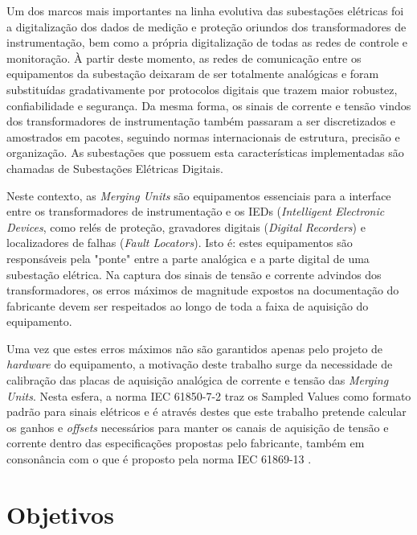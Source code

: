 Um dos marcos mais importantes na linha evolutiva das subestações elétricas foi a digitalização dos dados de medição e proteção oriundos dos transformadores de instrumentação, bem como a própria digitalização de todas as redes de controle e monitoração. À partir deste momento, as redes de comunicação entre os equipamentos da subestação deixaram de ser totalmente analógicas e foram substituídas gradativamente por protocolos digitais que trazem maior robustez, confiabilidade e segurança. Da mesma forma, os sinais de corrente e tensão vindos dos transformadores de instrumentação também passaram a ser discretizados e amostrados em pacotes, seguindo normas internacionais de estrutura, precisão e organização. As subestações que possuem esta características implementadas são chamadas de Subestações Elétricas Digitais.

Neste contexto, as \textit{Merging Units} são equipamentos essenciais para a interface entre os transformadores de instrumentação e os IEDs (\textit{Intelligent Electronic Devices}, como relés de proteção, gravadores digitais (\textit{Digital Recorders}) e localizadores de falhas (\textit{Fault Locators}). Isto é: estes equipamentos são responsáveis pela "ponte" entre a parte analógica e a parte digital de uma subestação elétrica. Na captura dos sinais de tensão e corrente advindos dos transformadores, os erros máximos de magnitude expostos na documentação do fabricante devem ser respeitados ao longo de toda a faixa de aquisição do equipamento.


Uma vez que estes erros máximos não são garantidos apenas pelo projeto de \textit{hardware} do equipamento, a motivação deste trabalho surge da necessidade de calibração das placas de aquisição analógica de corrente e tensão das \textit{Merging Units}. Nesta esfera, a norma IEC 61850-7-2 \cite{IEC61850_7-2} traz os Sampled Values como formato padrão para sinais elétricos e é através destes que este trabalho pretende calcular os ganhos e \textit{offsets} necessários para manter os canais de aquisição de tensão e corrente dentro das especificações propostas pelo fabricante, também em consonância com o que é proposto pela norma IEC 61869-13 \cite{IEC61869-13}. 

\section{Objetivos}

